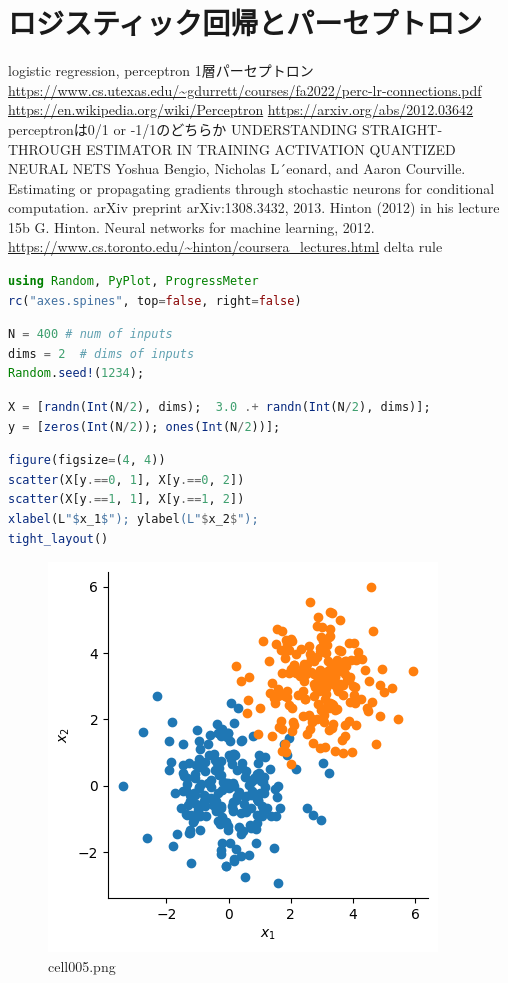 \section{ロジスティック回帰とパーセプトロン}
logistic regression, perceptron
1層パーセプトロン
\url{https://www.cs.utexas.edu/~gdurrett/courses/fa2022/perc-lr-connections.pdf}
\url{https://en.wikipedia.org/wiki/Perceptron}
\url{https://arxiv.org/abs/2012.03642}
perceptronは0/1 or -1/1のどちらか
UNDERSTANDING STRAIGHT-THROUGH ESTIMATOR IN TRAINING ACTIVATION QUANTIZED NEURAL NETS
Yoshua Bengio, Nicholas L´eonard, and Aaron Courville. Estimating or propagating gradients through stochastic neurons for conditional computation. arXiv preprint arXiv:1308.3432, 2013.
Hinton (2012) in his lecture 15b
G. Hinton. Neural networks for machine learning, 2012.
\url{https://www.cs.toronto.edu/~hinton/coursera_lectures.html}
delta rule
\begin{lstlisting}[language=julia]
using Random, PyPlot, ProgressMeter
rc("axes.spines", top=false, right=false)
\end{lstlisting}
\begin{lstlisting}[language=julia]
N = 400 # num of inputs
dims = 2  # dims of inputs 
Random.seed!(1234);
\end{lstlisting}
\begin{lstlisting}[language=julia]
X = [randn(Int(N/2), dims);  3.0 .+ randn(Int(N/2), dims)];
y = [zeros(Int(N/2)); ones(Int(N/2))];
\end{lstlisting}
\begin{lstlisting}[language=julia]
figure(figsize=(4, 4))
scatter(X[y.==0, 1], X[y.==0, 2])
scatter(X[y.==1, 1], X[y.==1, 2])
xlabel(L"$x_1$"); ylabel(L"$x_2$"); 
tight_layout()
\end{lstlisting}
\begin{figure}[ht]
	\centering
	\includegraphics[scale=0.8, max width=\linewidth]{./fig/local-learning-rule/logistic-regression-perceptron/cell005.png}
	\caption{cell005.png}
	\label{cell005.png}
\end{figure}
